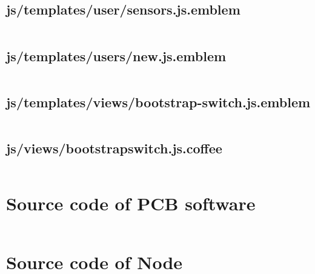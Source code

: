\documentclass[letterpaper, 12 pt]{article}
\begin{document}
\subsection{js/templates/user/sensors.js.emblem}
\inputminted{ruby}{../app/assets/javascripts/templates/user/sensors.js.emblem}

\subsection{js/templates/users/new.js.emblem}
\inputminted{ruby}{../app/assets/javascripts/templates/users/new.js.emblem}

\subsection{js/templates/views/bootstrap-switch.js.emblem}
\inputminted{ruby}{../app/assets/javascripts/templates/views/bootstrap-switch.js.emblem}

\subsection{js/views/bootstrap\textunderscore switch.js.coffee}
\inputminted{ruby}{../app/assets/javascripts/views/bootstrap_switch.js.coffee}

\section{Source code of PCB software}
\inputminted{c}{../../lifesense-pcb-software/lifesense/lifesense.ino}

\section{Source code of Node}
\inputminted{ruby}{../../lifesense-node/src/server.coffee}


\newpage
\end{document}
